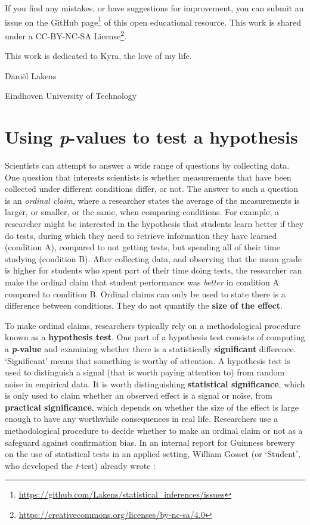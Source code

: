 \documentclass[
  oneside]{krantz}
\renewcommand{\href}[2]{#2\footnote{\url{#1}}}
\begin{document}
If you find any mistakes, or have suggestions for improvement, you can \href{https://github.com/Lakens/statistical_inferences/issues}{submit an issue on the GitHub page} of this open educational resource. This work is shared under a \href{https://creativecommons.org/licenses/by-nc-sa/4.0}{CC-BY-NC-SA License}.

This work is dedicated to Kyra, the love of my life.

Daniël Lakens

Eindhoven University of Technology

\mainmatter

\hypertarget{pvalue}{%
\chapter{\texorpdfstring{Using \emph{p}-values to test a hypothesis}{Using p-values to test a hypothesis}}\label{pvalue}}

Scientists can attempt to answer a wide range of questions by collecting data. One question that interests scientists is whether measurements that have been collected under different conditions differ, or not. The answer to such a question is an \emph{ordinal claim}, where a researcher states the average of the measurements is larger, or smaller, or the same, when comparing conditions. For example, a researcher might be interested in the hypothesis that students learn better if they do tests, during which they need to retrieve information they have learned (condition A), compared to not getting tests, but spending all of their time studying (condition B). After collecting data, and observing that the mean grade is higher for students who spent part of their time doing tests, the researcher can make the ordinal claim that student performance was \emph{better} in condition A compared to condition B. Ordinal claims can only be used to state there is a difference between conditions. They do not quantify the \textbf{size of the effect}.

To make ordinal claims, researchers typically rely on a methodological procedure known as a \textbf{hypothesis test}. One part of a hypothesis test consists of computing a \textbf{\emph{p}-value} and examining whether there is a statistically \textbf{significant} difference. `Significant' means that something is worthy of attention. A hypothesis test is used to distinguish a signal (that is worth paying attention to) from random noise in empirical data. It is worth distinguishing \textbf{statistical significance}, which is only used to claim whether an observed effect is a signal or noise, from \textbf{practical significance}, which depends on whether the size of the effect is large enough to have any worthwhile consequences in real life. Researchers use a methodological procedure to decide whether to make an ordinal claim or not as a safeguard against confirmation bias. In an internal report for Guinness brewery on the use of statistical tests in an applied setting, William Gosset (or `Student', who developed the \emph{t}-test) already wrote \citeyearpar{gosset_application_1904}:
\end{document}
